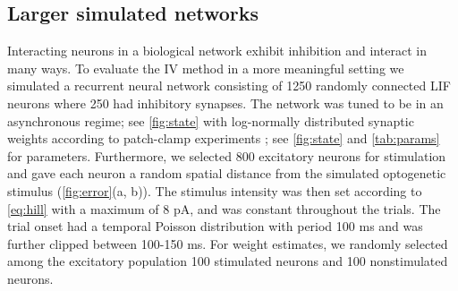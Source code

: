 \documentclass[11pt]{article}
\begin{document}
\subsection{Larger simulated networks}
Interacting neurons in a biological network exhibit inhibition and interact in many ways. 
To evaluate the IV method in a more meaningful setting we simulated a recurrent neural network consisting of 1250 randomly connected LIF neurons where 250 had inhibitory synapses. 
The network was tuned to be in an asynchronous regime; see \cref{fig:state} with log-normally distributed synaptic weights according to patch-clamp experiments \citep{Sayer1990,Mason1991}; see \cref{fig:state} and \cref{tab:params} for parameters. 
Furthermore, we selected 800 excitatory neurons for stimulation and gave each neuron a random spatial distance from the simulated optogenetic stimulus (\cref{fig:error}(a, b)). 
The stimulus intensity was then set according to \cref{eq:hill} with a maximum of 8 pA, and was constant throughout the trials. 
The trial onset had a temporal Poisson distribution with period 100 ms and was further clipped between 100-150 ms. 
For weight estimates, we randomly selected among the excitatory population 100 stimulated neurons and 100 nonstimulated neurons. 
\end{document}

